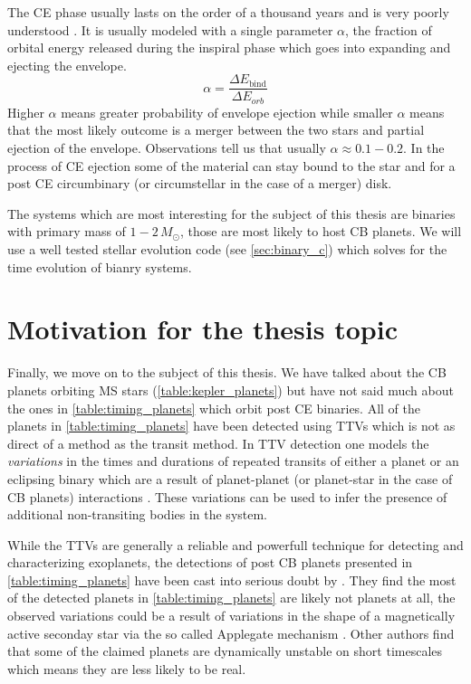 \documentclass[ twoside,openright,titlepage,numbers=noenddot,headinclude,%
                footinclude=true,cleardoublepage=empty,abstractoff, %
                BCOR=5mm,paper=a4,fontsize=11pt,%
                american,%
                ]{scrreprt}
\begin{document}
The CE phase usually lasts on the order of a thousand years and is very poorly
understood \citep{Ivanova2013}. It is usually modeled with a single parameter
$\alpha$, the fraction of orbital energy released during the inspiral
phase which goes into expanding and ejecting the envelope. 
\begin{equation}
    \alpha= \frac{\Delta E_\text{bind}}{\Delta E_{orb}} 
\end{equation}
Higher $\alpha$ means greater probability of envelope ejection 
while smaller $\alpha$ 
means that the most likely outcome is a merger between the two stars and 
partial ejection of the envelope.
Observations tell us that usually $\alpha\approx 0.1-0.2$. In the process of CE 
ejection some of the material can stay bound to the star and for a post CE
circumbinary (or circumstellar in the case of a merger) disk. 

The systems which are most interesting for the subject of this thesis are 
binaries with primary mass of $1-2\,M_\odot$, those are most likely to host
CB planets. We will use a well tested stellar evolution code (see 
\cref{sec:binary_c}) which solves for the time evolution of bianry systems.

\section{Motivation for the thesis topic}
\label{sec:two_populations}
Finally, we move on to the subject of this thesis. We have talked about the
CB planets orbiting MS stars (\cref{table:kepler_planets}) but have not said
much about the ones in \cref{table:timing_planets} which orbit post CE
binaries. All of the planets in \cref{table:timing_planets} have been detected
using TTVs which is not as direct of a method as the transit method. In TTV
detection one models the \emph{variations} in the times and durations of 
repeated transits of either a planet or an eclipsing binary which are a result
of planet-planet (or planet-star in the case of CB planets) interactions
\citep{agol2017}. These
variations can be used to infer the presence of additional non-transiting 
bodies in the system.

While the TTVs are generally a reliable and powerfull technique for detecting
and characterizing  exoplanets, the detections of post CB planets presented 
in \cref{table:timing_planets} have been cast into serious doubt by
\cite{zorotovic}. They find the most of the detected planets in 
\cref{table:timing_planets} are likely not planets at all, 
the observed variations could be  
a result of variations in the shape of a magnetically active 
seconday star via the so called Applegate mechanism \citep{applegate}. Other
authors \citep{hinse2012} find that some of the claimed planets
are dynamically unstable on short timescales which means they are less likely
to be real.
\end{document}
